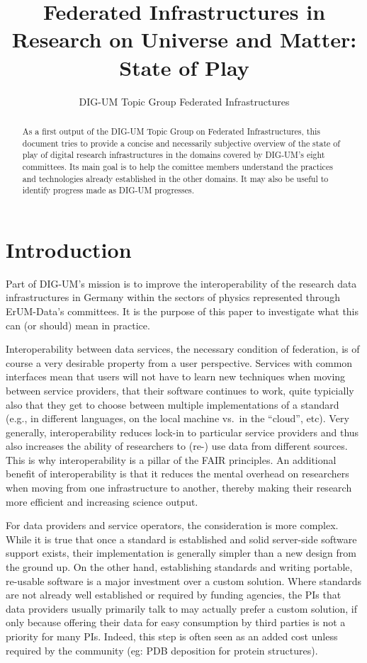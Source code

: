 \documentclass{article}
\title{Federated Infrastructures in Research on Universe and Matter:
State of Play}
\author{DIG-UM Topic Group Federated Infrastructures}
\begin{document}
\maketitle
\begin{abstract}
As a first output of the DIG-UM Topic Group on Federated Infrastructures,
this document tries to provide a concise and necessarily subjective
overview of the state of play of digital research infrastructures in
the domains covered by DIG-UM's eight committees.  Its main goal is to
help the comittee members understand the practices and technologies
already established in the other domains.  It may also be useful to
identify progress made as DIG-UM progresses.

\end{abstract}

\section{Introduction}

Part of DIG-UM's mission is to improve the interoperability of the
research data infrastructures in Germany within the sectors of physics
represented through ErUM-Data's committees.  It is the purpose of this
paper to investigate what this can (or should) mean in practice.

Interoperability between data services, the necessary condition of
federation,  is of course a very desirable property from a user
perspective.  Services with common interfaces mean that users will not
have to learn new techniques when moving between service providers,
that their software continues to work, quite typicially also that they
get to choose between multiple implementations of a standard (e.g., in
different languages, on the local machine vs.~in the ``cloud'', etc).
Very generally, interoperability reduces lock-in to particular service
providers and thus also increases the ability of researchers to (re-)
use data from different sources.  This is why interoperability is a
pillar of the FAIR principles.  An additional benefit of
interoperability is that it reduces the mental overhead on researchers
when moving from one infrastructure to another, thereby making their
research more efficient and increasing science output. 

For data providers and service operators, the consideration is more
complex.  While it is true that once a standard is established and solid
server-side software support exists, their implementation is generally
simpler than a new design from the ground up.  On the other hand,
establishing standards and writing portable, re-usable software is a
major investment over a custom solution.  Where standards are not
already well established or required by funding agencies, the PIs that
data providers usually primarily talk to may actually prefer a custom
solution, if only because offering their data for easy consumption by
third parties is not a priority for many PIs.  Indeed, this step is
often seen as an added cost unless required by the community (eg: PDB
deposition for protein structures).
\end{document}
